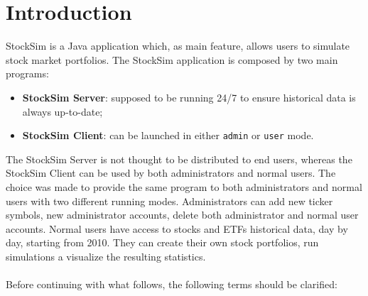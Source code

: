 \chapter{Introduction}
StockSim is a Java application which, as main feature, allows users to simulate 
stock market portfolios. The StockSim application is composed by two main 
programs:
\begin{itemize}
    \item \textbf{StockSim Server}: supposed to be running 24/7 to ensure 
            historical data is always up-to-date;
    \item \textbf{StockSim Client}: can be launched in either \texttt{admin} or 
            \texttt{user} mode.
\end{itemize}
The StockSim Server is not thought to be distributed to end users, whereas the 
StockSim Client can be used by both administrators and normal users. The choice 
was made to provide the same program to both administrators and normal users 
with two different running modes. Administrators can add new ticker symbols, 
new administrator accounts, delete both administrator and normal user accounts. 
Normal users have access to stocks and ETFs historical data, day by day, 
starting from 2010. They can create their own stock portfolios, run simulations 
a visualize the resulting statistics.\\
\\
Before continuing with what follows, the following terms should be clarified:
